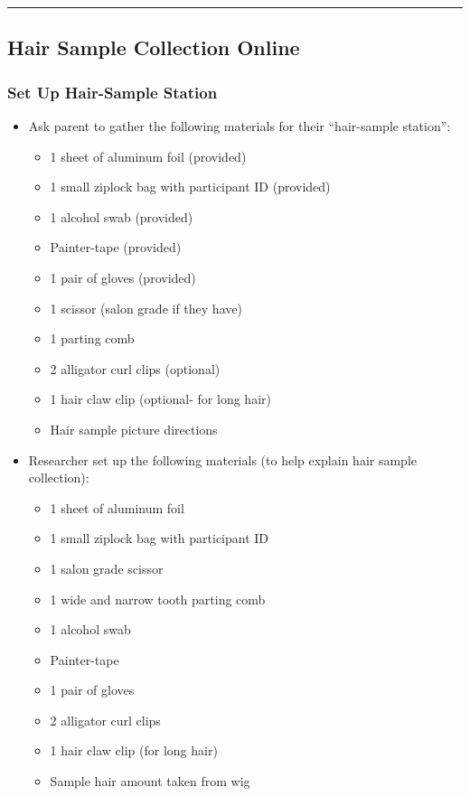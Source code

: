 \documentclass[]{book}
\providecommand{\tightlist}{%
  \setlength{\itemsep}{0pt}\setlength{\parskip}{0pt}}
\begin{document}
\begin{center}\rule{0.5\linewidth}{0.5pt}\end{center}

\hypertarget{hair-sample-collection-online}{%
\subsection{Hair Sample Collection Online}\label{hair-sample-collection-online}}

\hypertarget{set-up-hair-sample-station}{%
\subsubsection{Set Up Hair-Sample Station}\label{set-up-hair-sample-station}}

\begin{itemize}
\tightlist
\item
  Ask parent to gather the following materials for their ``hair-sample station'':

  \begin{itemize}
  \tightlist
  \item
    1 sheet of aluminum foil (provided)
  \item
    1 small ziplock bag with participant ID (provided)
  \item
    1 alcohol swab (provided)
  \item
    Painter-tape (provided)
  \item
    1 pair of gloves (provided)
  \item
    1 scissor (salon grade if they have)
  \item
    1 parting comb
  \item
    2 alligator curl clips (optional)
  \item
    1 hair claw clip (optional- for long hair)
  \item
    Hair sample picture directions
  \end{itemize}
\item
  Researcher set up the following materials (to help explain hair sample collection):

  \begin{itemize}
  \tightlist
  \item
    1 sheet of aluminum foil
  \item
    1 small ziplock bag with participant ID
  \item
    1 salon grade scissor
  \item
    1 wide and narrow tooth parting comb
  \item
    1 alcohol swab
  \item
    Painter-tape
  \item
    1 pair of gloves
  \item
    2 alligator curl clips
  \item
    1 hair claw clip (for long hair)
  \item
    Sample hair amount taken from wig
  \end{itemize}
\end{itemize}
\end{document}
